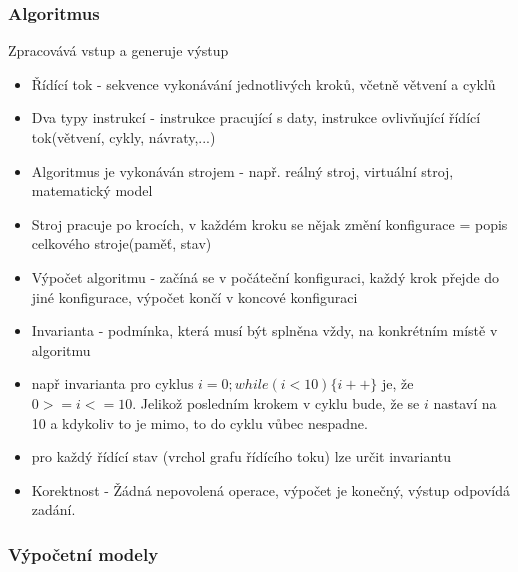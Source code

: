 \documentclass[10pt,a4paper]{article}
\begin{document}
\subsubsection{Algoritmus}
Zpracovává vstup a generuje výstup
\begin{itemize}
\item Řídící tok - sekvence vykonávání jednotlivých kroků, včetně větvení a cyklů
\item Dva typy instrukcí - instrukce pracující s daty, instrukce ovlivňující řídící tok(větvení, cykly, návraty,...)
\item Algoritmus je vykonáván strojem - např. reálný stroj, virtuální stroj, matematický model
\item Stroj pracuje po krocích, v každém kroku se nějak změní konfigurace = popis celkového stroje(paměť, stav)
\item Výpočet algoritmu - začíná se v počáteční konfiguraci, každý krok přejde do jiné konfigurace, výpočet končí v koncové konfiguraci
\item Invarianta - podmínka, která musí být splněna vždy, na konkrétním místě v algoritmu
\item např invarianta pro cyklus $i=0;while(i<10)\{i++\}$ je, že $0 >= i <= 10$. Jelikož posledním krokem v cyklu bude, že se $i$ nastaví na 10 a kdykoliv to je mimo, to do cyklu vůbec nespadne.
\item pro každý řídící stav (vrchol grafu řídícího toku) lze určit invariantu
\item Korektnost - Žádná nepovolená operace, výpočet je konečný, výstup odpovídá zadání.
\end{itemize}
\subsubsection{Výpočetní modely}
\end{document}
